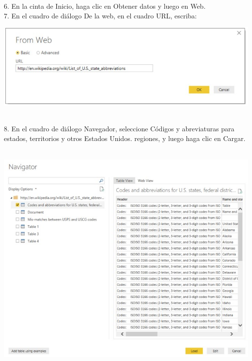 \documentclass[12pt,letterpaper]{article}
\begin{document}
\begin{flushleft}
\begin{itemize}
\textbf{ }\\
\textbf{ }\\
6. En la cinta de Inicio, haga clic en Obtener datos y luego en Web.\\
7. En el cuadro de diálogo De la web, en el cuadro URL, escriba:\\
\begin{center}
	\includegraphics[width=16cm]{./Imagenes/image28} 
	\end{center}
\textbf{ }\\

8. En el cuadro de diálogo Navegador, seleccione Códigos y abreviaturas para estados, territorios y otros Estados Unidos.
regiones, y luego haga clic en Cargar.\\

\textbf{ }\\
\begin{center}
	\includegraphics[width=15cm]{./Imagenes/image29} 
	\end{center}
\textbf{ }\\


\end{itemize}
\end{flushleft}
\end{document}
